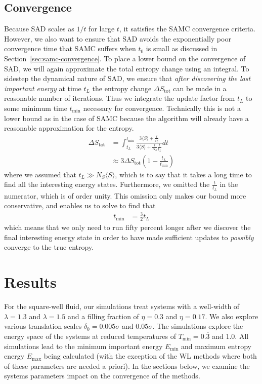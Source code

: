 \documentclass[letterpaper,twocolumn,amsmath,amssymb,pre,aps,10pt]{revtex4-1}
\begin{document}
\subsection{Convergence}
Because SAD scales as $1/t$ for large $t$, it satisfies the SAMC
convergence criteria.  However, we also want to ensure that SAD avoids
the exponentially poor convergence time that SAMC suffers when $t_0$ is
small as discussed in Section~\ref{sec:samc-convergence}.
To place a lower bound on the convergence of SAD, we will again
approximate the total entropy change using an integral.  To sidestep
the dynamical nature of SAD, we ensure that \emph{after discovering the
last important energy} at time $t_L$ the entropy change
$\Delta S_{\text{tot}}$ can be made in a reasonable number of iterations.
Thus we integrate the update factor from $t_L$ to some minimum time
$t_{\min}$ necessary for convergence.  Technically this is not a lower
bound as in the case of SAMC because the algorithm will already have a
reasonable approximation for the entropy.
\begin{align}
\Delta S_{\text{tot}} &= \int_{t_L}^{t_{\min}}
     \frac{
       3\langle S\rangle + \frac{t}{t_L}
     }{
       3\langle S\rangle + \frac{t}{N_S}\frac{t}{t_L}
     } dt \\
&\approx 3\Delta S_{\text{tot}} \left(1-\frac{t_L}{t_{\min}}\right)
\end{align}
where we assumed that $t_L\gg N_S\langle S\rangle$, which is to say
that it takes a long time to find all the interesting energy states.
Furthermore, we omitted the $\frac{t}{t_L}$ in the numerator, which is
of order unity.  This omission only makes our bound more conservative,
and enables us to solve to find that
\begin{align}
  t_{\min} &= \frac32 t_L
\end{align}
which means that we only need to run fifty percent longer after we
discover the final interesting energy state in order to have made
sufficient updates to \emph{possibly} converge to the true entropy.

\section{Results}\label{sec:results}

For the square-well fluid, our simulations treat systems with a
well-width of $\lambda = 1.3$ and $\lambda = 1.5$ and a filling fraction of
$\eta = 0.3$ and $\eta = 0.17$. We also explore various translation scales $\delta_0 = 0.005\sigma$ and
$0.05\sigma$. The simulations explore the
energy space of the systems at reduced temperatures of
$T_{\text{min}} = 0.\overline{3}$ and $1.0$.  All simulations lead to the minimum important
energy $E_{\min}$ and maximum entropy energy $E_{\max}$
being calculated (with the exception of the WL methods where both
of these parameters are needed a priori).  In the sections below, we
examine the systems parameters impact on the convergence of the methods.
\end{document}
